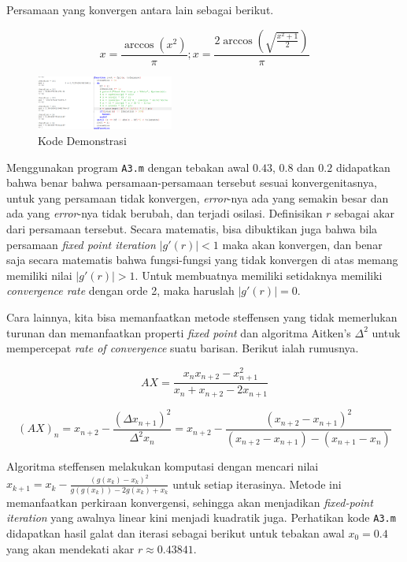 \documentclass[11pt, a4paper, onecolumn, oneside, final]{report}
\begin{document}
Persamaan yang konvergen antara lain sebagai berikut.

$$
x = \frac{\arccos(x^2)}{\pi}; x = \frac{2\arccos(\sqrt{\frac{x^2 + 1}{2}})}{\pi}
$$

\begin{figure}[h!]
    \centering
    \includegraphics[width=0.4\textwidth]{assets/A3_1.png}
    \caption{Kode Demonstrasi}
\end{figure}

Menggunakan program \texttt{A3.m} dengan tebakan awal $0.43$, $0.8$ dan $0.2$ didapatkan bahwa benar bahwa persamaan-persamaan tersebut sesuai konvergenitasnya, untuk yang persamaan tidak konvergen, \textit{error}-nya ada yang semakin besar dan ada yang \textit{error}-nya tidak berubah, dan terjadi osilasi. Definisikan $r$ sebagai akar dari persamaan tersebut. Secara matematis, bisa dibuktikan juga bahwa bila persamaan \textit{fixed point iteration} $|g'(r)| < 1$ maka akan konvergen, dan benar saja secara matematis bahwa fungsi-fungsi yang tidak konvergen di atas memang memiliki nilai $|g'(r)| > 1$. Untuk membuatnya memiliki setidaknya memiliki \textit{convergence rate} dengan orde 2, maka haruslah $|g'(r)| = 0$.

Cara lainnya, kita bisa memanfaatkan metode steffensen yang tidak memerlukan turunan dan memanfaatkan properti \textit{fixed point} dan algoritma Aitken's $\Delta^2$ untuk mempercepat \textit{rate of convergence} suatu barisan. Berikut ialah rumusnya.

$$
AX = \frac{x_n x_{n+2} - x_{n+1}^2}{x_n + x_{n+2} - 2x_{n+1}}
$$

$$
(AX)_{n}=x_{n+2}-{\frac {(\Delta x_{n+1})^{2}}{\Delta ^{2}x_{n}}}=x_{n+2}-{\frac {(x_{n+2}-x_{n+1})^{2}}{(x_{n+2}-x_{n+1})-(x_{n+1}-x_{n})}}
$$

Algoritma steffensen melakukan komputasi dengan mencari nilai $x_{k + 1} = x_k - \frac{(g(x_k) - x_k)^2}{g(g(x_k)) - 2 g(x_k) + x_k}$ untuk setiap iterasinya. Metode ini memanfaatkan perkiraan konvergensi, sehingga akan menjadikan \textit{fixed-point iteration} yang awalnya linear kini menjadi kuadratik juga. Perhatikan kode \texttt{A3.m} didapatkan hasil galat dan iterasi sebagai berikut untuk tebakan awal $x_0 = 0.4$ yang akan mendekati akar $r \approx 0.43841$.
\end{document}
